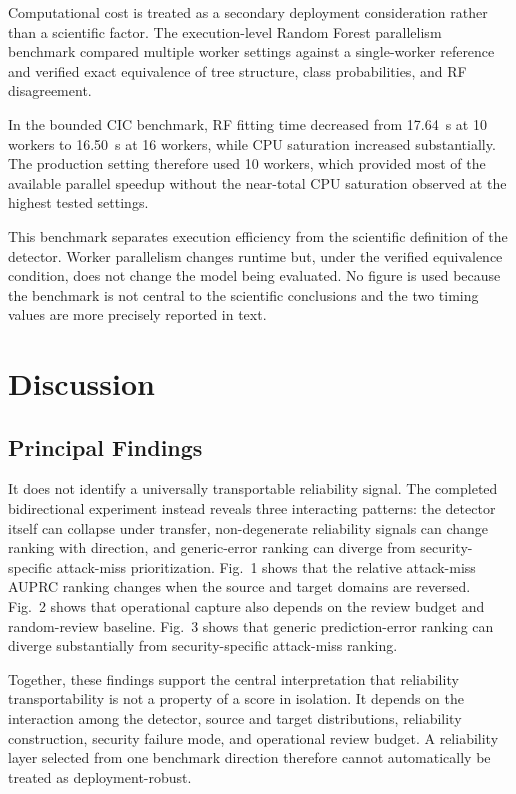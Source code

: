 \documentclass[conference]{IEEEtran}
\begin{document}
Computational cost is treated as a secondary deployment consideration rather than a scientific factor. The execution-level Random Forest parallelism benchmark compared multiple worker settings against a single-worker reference and verified exact equivalence of tree structure, class probabilities, and RF disagreement.

In the bounded CIC benchmark, RF fitting time decreased from 17.64~s at 10 workers to 16.50~s at 16 workers, while CPU saturation increased substantially. The production setting therefore used 10 workers, which provided most of the available parallel speedup without the near-total CPU saturation observed at the highest tested settings.

This benchmark separates execution efficiency from the scientific definition of the detector. Worker parallelism changes runtime but, under the verified equivalence condition, does not change the model being evaluated. No figure is used because the benchmark is not central to the scientific conclusions and the two timing values are more precisely reported in text.

\section{Discussion}

\subsection{Principal Findings}

It does not identify a universally transportable reliability signal. The completed bidirectional experiment instead reveals three interacting patterns: the detector itself can collapse under transfer, non-degenerate reliability signals can change ranking with direction, and generic-error ranking can diverge from security-specific attack-miss prioritization. Fig.~1 shows that the relative attack-miss AUPRC ranking changes when the source and target domains are reversed. Fig.~2 shows that operational capture also depends on the review budget and random-review baseline. Fig.~3 shows that generic prediction-error ranking can diverge substantially from security-specific attack-miss ranking.

Together, these findings support the central interpretation that reliability transportability is not a property of a score in isolation. It depends on the interaction among the detector, source and target distributions, reliability construction, security failure mode, and operational review budget. A reliability layer selected from one benchmark direction therefore cannot automatically be treated as deployment-robust.
\end{document}
